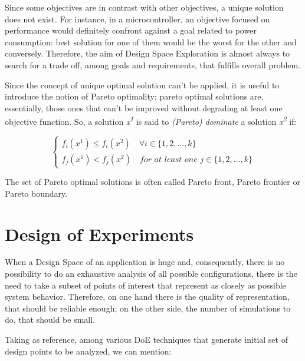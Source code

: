 Since some objectives are in contrast with other objectives, a unique solution does not exist. For instance, in a microcontroller, an objective focused on performance would definitely confront against a goal related to power consumption: best solution for one of them would be the worst for the other and conversely. Therefore, the aim of Design Space Exploration is almost always to search for a trade off, among goals and requirements, that fulfills overall problem.

Since the concept of unique optimal solution can't be applied, it is useful to introduce the notion of Pareto optimality; pareto optimal solutions are, essentially, those ones that can't be improved without degrading at least one objective function. So, a solution \textit{x\textsuperscript{1}} is said to \textit{(Pareto) dominate} a solution \textit{x\textsuperscript{2}} if:

\begin{equation}
\begin{cases}
        f_i(x^1) \le f_i(x^2) \quad \forall i \in \{1, 2, ..., k\} \\
        f_j(x^1) < f_j(x^2) \quad \textit{for at least one } j \in \{1, 2, ..., k\}
\end{cases}
\end{equation}

The set of Pareto optimal solutions is often called Pareto front, Pareto frontier or Pareto boundary.





\section{Design of Experiments}\label{doe}

When a Design Space of an application is huge and, consequently, there is no possibility to do an exhaustive analysis of all possible configurations, there is the need to take a subset of points of interest that represent as closely as possible system behavior. Therefore, on one hand there is the quality of representation, that should be reliable enough; on the other side, the number of simulations to do, that should be small.

Taking \cite{natrella2013nist} as reference, among various DoE techniques that generate initial set of design points to be analyzed, we can mention:

